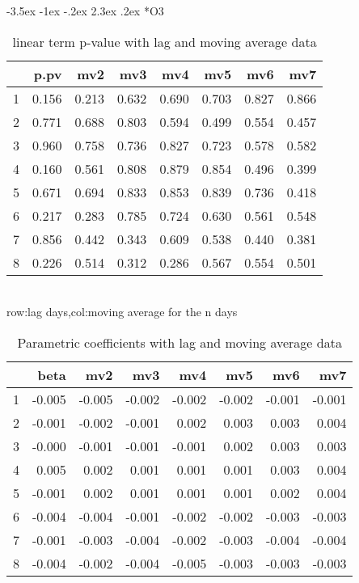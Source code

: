 \documentclass[a4paper, 12pt]{article}
\makeatletter
\def\large{\fontsize{14}{20}\selectfont}
\renewcommand\subsection{\@startsection {subsection}{1}{\z@}%
                                   {-3.5ex \@plus -1ex \@minus -.2ex}%
                                   {2.3ex \@plus.2ex}%
                                   {\centering\normalfont\large\bfseries}}
\makeatother
\begin{document}
\subsection*{O3}
\begin{table}[h]
\centering
\caption{linear term p-value with lag and moving average data}
\begin{tabular}{rrrrrrrr}
  \hline
 & p.pv & mv2 & mv3 & mv4 & mv5 & mv6 & mv7 \\
  \hline
1 & 0.156 & 0.213 & 0.632 & 0.690 & 0.703 & 0.827 & 0.866 \\
  2 & 0.771 & 0.688 & 0.803 & 0.594 & 0.499 & 0.554 & 0.457 \\
  3 & 0.960 & 0.758 & 0.736 & 0.827 & 0.723 & 0.578 & 0.582 \\
  4 & 0.160 & 0.561 & 0.808 & 0.879 & 0.854 & 0.496 & 0.399 \\
  5 & 0.671 & 0.694 & 0.833 & 0.853 & 0.839 & 0.736 & 0.418 \\
  6 & 0.217 & 0.283 & 0.785 & 0.724 & 0.630 & 0.561 & 0.548 \\
  7 & 0.856 & 0.442 & 0.343 & 0.609 & 0.538 & 0.440 & 0.381 \\
  8 & 0.226 & 0.514 & 0.312 & 0.286 & 0.567 & 0.554 & 0.501 \\
   \hline
\end{tabular}
\\row:lag days,col:moving average for the n days
\end{table}

\begin{table}[h]
\centering
\caption{Parametric coefficients with lag and moving average data}
\begin{tabular}{rrrrrrrr}
  \hline
 & beta & mv2 & mv3 & mv4 & mv5 & mv6 & mv7 \\
  \hline
1 & -0.005 & -0.005 & -0.002 & -0.002 & -0.002 & -0.001 & -0.001 \\
  2 & -0.001 & -0.002 & -0.001 & 0.002 & 0.003 & 0.003 & 0.004 \\
  3 & -0.000 & -0.001 & -0.001 & -0.001 & 0.002 & 0.003 & 0.003 \\
  4 & 0.005 & 0.002 & 0.001 & 0.001 & 0.001 & 0.003 & 0.004 \\
  5 & -0.001 & 0.002 & 0.001 & 0.001 & 0.001 & 0.002 & 0.004 \\
  6 & -0.004 & -0.004 & -0.001 & -0.002 & -0.002 & -0.003 & -0.003 \\
  7 & -0.001 & -0.003 & -0.004 & -0.002 & -0.003 & -0.004 & -0.004 \\
  8 & -0.004 & -0.002 & -0.004 & -0.005 & -0.003 & -0.003 & -0.003 \\
   \hline
\end{tabular}
\end{table}
\end{document}
